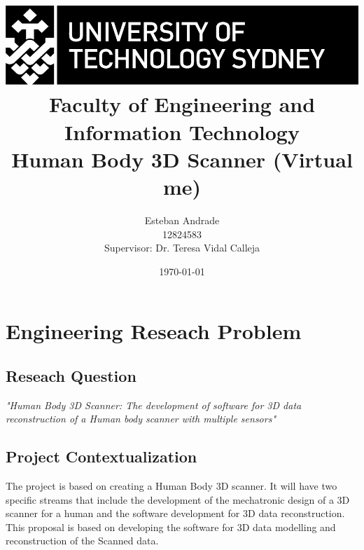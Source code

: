 \documentclass[12pt]{report}
\begin{document}
\begin{titlepage}

   

    \title{ \includegraphics[scale=1.7]{utslogo.jpg}\\[1cm]  
    Faculty of Engineering and Information Technology\\[1.0cm] 
    \Large{\textbf{Human Body 3D Scanner (Virtual me)}}\\}
    \author{Esteban Andrade\\ 
    12824583\\
    Supervisor: Dr. Teresa Vidal Calleja\\}
    \date{\today}  
     \maketitle
     \cleardoublepage
\end{titlepage}

\tableofcontents
\listoffigures
\listoftables
\thispagestyle{empty}
\newpage
\setcounter{page}{1}

\chapter{Engineering Reseach Problem}

\section{Reseach Question}
\textit{\large{"Human Body 3D Scanner: The development of software for 3D data reconstruction of a Human body scanner with multiple sensors" }}

\section{Project Contextualization}
The project is based on creating a Human Body 3D scanner.
It will have two specific streams that include the development of  the mechatronic design of a 3D scanner for a human and the software development for 3D data reconstruction. 
This proposal is based on developing the software for 3D data modelling and reconstruction of the Scanned data.
\end{document}
